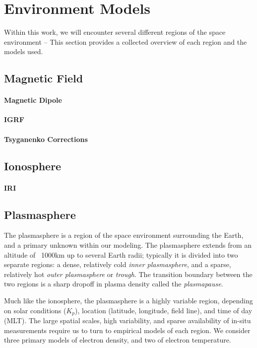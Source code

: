 \section{Environment Models}
Within this work, we will encounter several different regions of the space environment -- This section provides a collected overview of each region and the models used.
\subsection{Magnetic Field}
\paragraph{Magnetic Dipole}
\paragraph{IGRF}
\paragraph{Tsyganenko Corrections}
\subsection{Ionosphere}
\paragraph{IRI}

\subsection{Plasmasphere}
The plasmasphere is a region of the space environment surrounding the Earth, and a primary unknown within our modeling. The plasmasphere extends from an altitude of ~1000km up to several Earth radii; typically it is divided into two separate regions: a dense, relatively cold \emph{inner plasmasphere}, and a sparse, relatively hot \emph{outer plasmasphere} or \emph{trough}. The transition boundary between the two regions is a sharp dropoff in plasma density called the \emph{plasmapause}.

Much like the ionosphere, the plasmasphere is a highly variable region, depending on solar conditions ($K_p$), location (latitude, longitude, field line), and time of day (MLT). The large spatial scales, high variability, and sparse availability of in-situ measurements require us to turn to empirical models of each region. We consider three primary models of electron density, and two of electron temperature.

